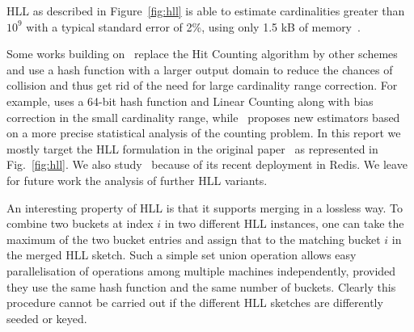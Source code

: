 \documentclass{article}
\begin{document}
HLL as described in Figure~\ref{fig:hll} is able to estimate cardinalities greater than $10^9$ with a typical standard error of 2\%, using only 1.5 kB of memory~\cite{hll}.

Some works building on~\cite{hll} replace the Hit Counting algorithm by other schemes and use a hash function with a larger output domain to reduce the chances of collision and thus get rid of the need for large cardinality range correction. For example, \cite{hllpractice} uses a 64-bit hash function and Linear Counting along with bias correction in the small cardinality range, while~\cite{hllnew} proposes new estimators based on a more precise statistical analysis of the counting problem. In this report we mostly target the HLL formulation in the original paper~\cite{hll} as represented in Fig.~\ref{fig:hll}. We also study~\cite{hllnew} because of its recent deployment in Redis.  We leave for future work the analysis of further HLL variants. 

An interesting property of HLL is that it supports merging in a lossless way. To combine two buckets at index $i$ in two different HLL instances, one can take the maximum of the two bucket entries and assign that to the matching bucket $i$ in the merged HLL sketch. Such a simple set union operation allows easy parallelisation of operations among multiple machines independently, provided they use the same hash function and the same number of buckets. Clearly this procedure cannot be carried out if the different HLL sketches are differently seeded or keyed.
\end{document}
